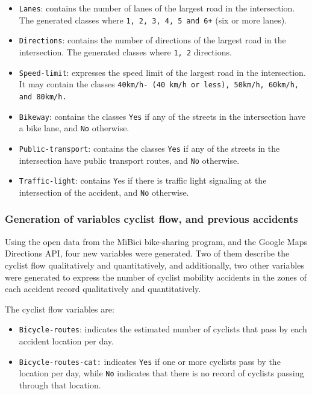 \documentclass[preprint,12pt]{elsarticle}
\begin{document}
\begin{itemize}
    \item \texttt{Lanes}: contains the number of lanes of the largest road in the intersection. The generated classes where \texttt{1, 2, 3, 4, 5 and 6+} (six or more lanes).
    \item \texttt{Directions}: contains the number of directions of the largest road in the intersection. The generated classes where \texttt{1, 2} directions.
    \item \texttt{Speed-limit}: expresses the speed limit of the largest road in the intersection. It may contain the classes \texttt{40km/h- (40 km/h or less), 50km/h, 60km/h, and 80km/h.}
    \item \texttt{Bikeway}: contains the classes \texttt{Yes} if any of the streets in the intersection have a bike lane, and \texttt{No} otherwise.
    \item \texttt{Public-transport}: contains the classes \texttt{Yes} if any of the streets in the intersection have public transport routes, and \texttt{No} otherwise.
    \item \texttt{Traffic-light}: contains \texttt{Y}es if there is traffic light signaling at the intersection of the accident, and \texttt{No} otherwise.
\end{itemize}

\subsubsection{Generation of variables cyclist flow, and previous accidents}
Using the open data from the MiBici bike-sharing program, and the Google Maps Directions API, four new variables were generated. Two of them describe the cyclist flow qualitatively and quantitatively, and additionally, two other variables were generated to express the number of cyclist mobility accidents in the zones of each accident record qualitatively and quantitatively.

The cyclist flow variables are: 
\begin{itemize}
    \item \texttt{Bicycle-routes}: indicates the estimated number of cyclists that pass by each accident location per day.

    \item \texttt{Bicycle-routes-cat:} indicates \texttt{Yes} if one or more cyclists pass by the location per day, while \texttt{No} indicates that there is no record of cyclists passing through that location.
\end{itemize}{}
\end{document}
